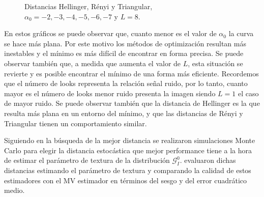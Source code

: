 \begin{figure}[h!]
	\centering    
	\caption{\label{DistL8}\small Distancias Hellinger, Rényi y Triangular, $\alpha_0= -2,-3,-4,-5,-6,-7$ y $L=8$.}
\end{figure}

En estos gráficos se puede observar que, cuanto menor es el valor de $\alpha_0$ la curva se hace más plana. Por este motivo los métodos de optimización resultan más inestables y el mínimo es más difícil de encontrar en forma precisa. Se puede observar también que, a medida que aumenta el valor de $L$, esta situación se revierte y es posible encontrar el mínimo de una forma más eficiente. Recordemos que el número de looks representa la relación señal ruido, por lo tanto, cuanto mayor es el número de looks menor ruido presenta la imagen siendo $L=1$ el caso de mayor ruido. Se puede observar también que la distancia de Hellinger es la que resulta más plana en un entorno del mínimo, y que las distancias de Rényi y Triangular tienen un comportamiento similar.

Siguiendo en la búsqueda de la mejor distancia se realizaron simulaciones Monte Carlo para elegir la distancia estocástica que mejor performance tiene a la hora de estimar el parámetro de textura de la distribución $\mathcal{G}_I^0$. \citet{cassettiast2013} evaluaron dichas distancias estimando el parámetro de textura y  comparando la calidad de estos estimadores con el MV estimador en términos del sesgo y del error cuadrático medio. 

